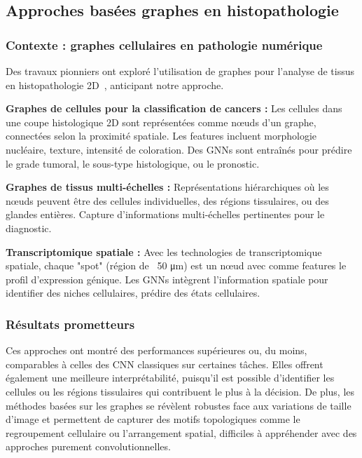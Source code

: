 \subsection{Approches basées graphes en histopathologie}

\subsubsection{Contexte : graphes cellulaires en pathologie numérique}

Des travaux pionniers ont exploré l'utilisation de graphes pour l'analyse de tissus en histopathologie 2D~\cite{Zhou2019,Jaume2021,Pati2022}, anticipant notre approche.

\textbf{Graphes de cellules pour la classification de cancers :}
Les cellules dans une coupe histologique 2D sont représentées comme nœuds d'un graphe, connectées selon la proximité spatiale. Les features incluent morphologie nucléaire, texture, intensité de coloration. Des GNNs sont entraînés pour prédire le grade tumoral, le sous-type histologique, ou le pronostic.

\textbf{Graphes de tissus multi-échelles :}
Représentations hiérarchiques où les nœuds peuvent être des cellules individuelles, des régions tissulaires, ou des glandes entières. Capture d'informations multi-échelles pertinentes pour le diagnostic.

\textbf{Transcriptomique spatiale :}
Avec les technologies de transcriptomique spatiale, chaque "spot" (région de ~50 μm) est un nœud avec comme features le profil d'expression génique. Les GNNs intègrent l'information spatiale pour identifier des niches cellulaires, prédire des états cellulaires.

\subsubsection{Résultats prometteurs}

Ces approches ont montré des performances supérieures ou, du moins, comparables à celles des CNN classiques sur certaines tâches. Elles offrent également une meilleure interprétabilité, puisqu’il est possible d’identifier les cellules ou les régions tissulaires qui contribuent le plus à la décision. De plus, les méthodes basées sur les graphes se révèlent robustes face aux variations de taille d’image et permettent de capturer des motifs topologiques comme le regroupement cellulaire ou l’arrangement spatial, difficiles à appréhender avec des approches purement convolutionnelles.

